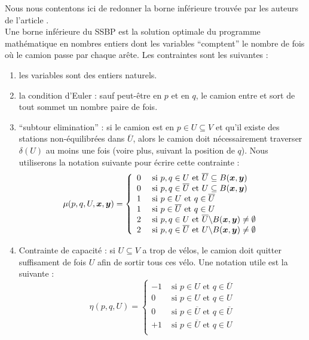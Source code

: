 Nous nous contentons ici de redonner la borne inférieure trouvée par les auteurs de l'article \cite{Benchimol2011}.
\\

Une borne inférieure du SSBP est la solution optimale du programme mathématique en nombres entiers dont les variables ``comptent'' le nombre de fois où le camion passe par chaque arête. Les contraintes sont les suivantes :
\begin{enumerate}[label=(\roman*)]
\item les variables sont des entiers naturels.
\item la condition d'Euler : sauf peut-être en $p$ et en $q$, le camion entre et sort de tout sommet un nombre paire de fois.
\item ``subtour elimination'' : si le camion est en $p \in U \subseteq V $ et qu'il existe des stations non-équilibrées dans $\overline{U}$, alors le camion doit nécessairement traverser $\delta(U)$ au moins une fois (voire plus, suivant la position de $q$). Nous utiliserons la notation suivante pour écrire cette contrainte :
\[
\mu(p,q,U,\boldsymbol{x},\boldsymbol{y}) = \left\{
\begin{array}{ll}
  0 &\mbox{ si } p,q \in U            \mbox{ et } \overline{U} \subseteq B(\boldsymbol{x},\boldsymbol{y})\\
  0 &\mbox{ si } p,q \in \overline{U} \mbox{ et } U \subseteq B(\boldsymbol{x},\boldsymbol{y})\\
  1 &\mbox{ si } p \in U              \mbox{ et } q \in \overline{U}\\
  1 &\mbox{ si } p \in \overline{U}   \mbox{ et } q \in U\\
  2 &\mbox{ si } p,q \in U            \mbox{ et } \overline{U} \backslash B(\boldsymbol{x},\boldsymbol{y}) \ne \emptyset\\
  2 &\mbox{ si } p,q \in \overline{U} \mbox{ et } U \backslash B(\boldsymbol{x},\boldsymbol{y}) \ne \emptyset
\end{array}
\right.
\]
\item Contrainte de capacité : si $U \subseteq V$ a trop de vélos, le camion doit quitter suffisament de fois $U$ afin de sortir tous ces vélo. Une notation utile est la suivante :
\[
\eta(p,q,U) = \left\{
\begin{array}{ll}
  -1 &\mbox{ si } p \in U            \mbox{ et } q \in \overline{U}\\
  0  &\mbox{ si } p \in U            \mbox{ et } q \in U\\
  0  &\mbox{ si } p \in \overline{U} \mbox{ et } q \in \overline{U}\\
  +1 &\mbox{ si } p \in \overline{U} \mbox{ et } q \in U\\
\end{array}
\right.
\]
\end{enumerate}

